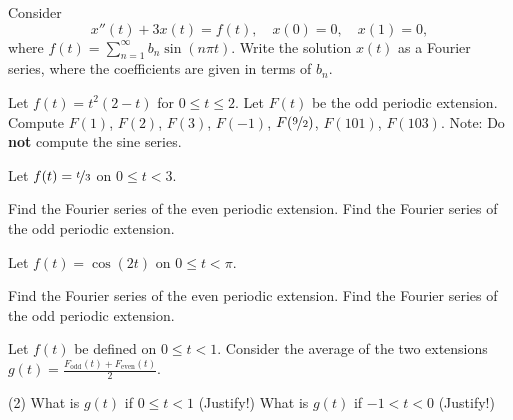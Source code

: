 \begin{exercise}
Consider
\begin{equation*}
x''(t) + 3 x(t) = f(t) , \quad x(0) = 0, \quad x(1) = 0,
\end{equation*}
where $f(t) = \sum_{n=1}^\infty b_n \sin (n \pi t)$.  Write the solution $x(t)$
as a Fourier series, where the coefficients are given in terms of $b_n$.
\end{exercise}

\begin{exercise}
Let $f(t) = t^2(2-t)$ for $0 \leq t \leq 2$.  Let $F(t)$ be the odd periodic
extension.  Compute $F(1)$, $F(2)$, $F(3)$, $F(-1)$, $F(\nicefrac{9}{2})$,
$F(101)$, $F(103)$.  Note: Do \textbf{not} compute the sine series.
\end{exercise}

\setcounter{exercise}{100}

\begin{exercise}
Let $f(t) = \nicefrac{t}{3}$ on $0 \leq t < 3$.
\begin{tasks}
\task Find the Fourier series of the even periodic extension.
\task Find the Fourier series of the odd periodic extension.
\end{tasks}
\end{exercise}

\begin{exercise}
Let $f(t) = \cos(2t)$ on $0 \leq t < \pi$.
\begin{tasks}
\task Find the Fourier series of the even periodic extension.
\task Find the Fourier series of the odd periodic extension.
\end{tasks}
\end{exercise}

\begin{exercise}
Let $f(t)$ be defined on $0 \leq t < 1$.  Consider
the average of the two extensions
$g(t) = \frac{F_{\text{odd}}(t)+ F_{\text{even}}(t)}{2}$.
\begin{tasks}(2)
\task What is $g(t)$ if $0 \leq t < 1$ (Justify!)
\task What is $g(t)$ if $-1 < t < 0$ (Justify!)
\end{tasks}
\end{exercise}

